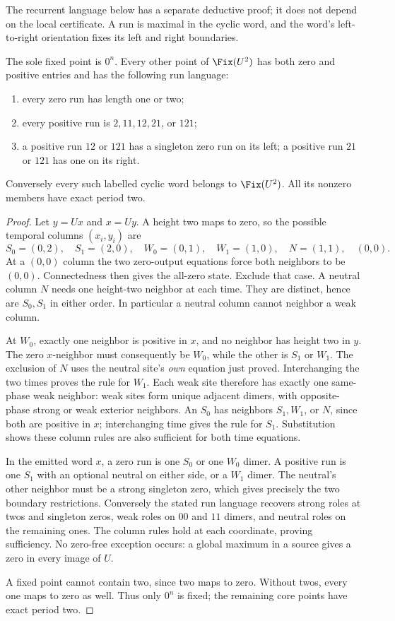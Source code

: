 The recurrent language below has a separate deductive proof; it does
not depend on the local certificate. A run is maximal in the cyclic
word, and the word's left-to-right orientation fixes its left and right
boundaries.

\begin{theorem}\label{thm:core}
 The sole fixed point is $0^n$. Every other point of $\Fix(U^2)$ has
 both zero and positive entries and has the following run language:
 \begin{enumerate}
 \item every zero run has length one or two;
 \item every positive run is $2,11,12,21$, or $121$;
 \item a positive run $12$ or $121$ has a singleton zero run on its
 left; a positive run $21$ or $121$ has one on its right.
 \end{enumerate}
 Conversely every such labelled cyclic word belongs to $\Fix(U^2)$.
 All its nonzero members have exact period two.
\end{theorem}
\begin{proof}
 Let $y=Ux$ and $x=Uy$. A height two maps to zero, so the possible
 temporal columns $(x_i,y_i)$ are
 \[
 S_0=(0,2),\quad S_1=(2,0),\quad W_0=(0,1),\quad
 W_1=(1,0),\quad N=(1,1),\quad (0,0).
 \]
 At a $(0,0)$ column the two zero-output equations force both neighbors
 to be $(0,0)$. Connectedness then gives the all-zero state. Exclude
 that case. A neutral column $N$ needs one height-two neighbor at
 each time. They are distinct, hence are $S_0,S_1$ in either order.
 In particular a neutral column cannot neighbor a weak column.

 At $W_0$, exactly one neighbor is positive in $x$, and no neighbor
 has height two in $y$. The zero $x$-neighbor must consequently be
 $W_0$, while the other is $S_1$ or $W_1$. The exclusion of $N$ uses
 the neutral site's \emph{own} equation just proved. Interchanging
 the two times proves the rule for $W_1$. Each weak site therefore
 has exactly one same-phase weak neighbor: weak sites form unique
 adjacent dimers, with opposite-phase strong or weak exterior neighbors.
 An $S_0$ has neighbors $S_1,W_1$, or $N$, since both are positive
 in $x$; interchanging time gives the rule for $S_1$. Substitution
 shows these column rules are also sufficient for both time equations.

 In the emitted word $x$, a zero run is one $S_0$ or one $W_0$ dimer.
 A positive run is one $S_1$ with an optional neutral on either side,
 or a $W_1$ dimer. The neutral's other neighbor must be a strong
 singleton zero, which gives precisely the two boundary restrictions.
 Conversely the stated run language recovers strong roles at twos and
 singleton zeros, weak roles on $00$ and $11$ dimers, and neutral roles
 on the remaining ones. The column rules hold at each coordinate,
 proving sufficiency. No zero-free exception occurs: a global maximum
 in a source gives a zero in every image of $U$.

 A fixed point cannot contain two, since two maps to zero. Without twos,
 every one maps to zero as well. Thus only $0^n$ is fixed; the remaining
 core points have exact period two.
\end{proof}
